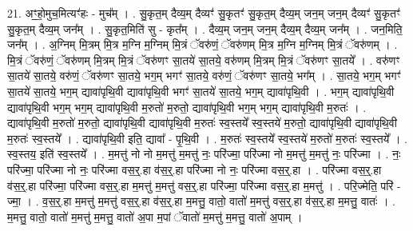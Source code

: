 \documentclass[17pt]{extarticle}
\begin{document}
21. अꣳ॒॒हो॒मुच॒मित्यꣳ॑हः - मुच᳚म् । . सु॒कृत॒म् दैव्य॒म् दैव्यꣳ॑ सु॒कृतꣳ॑ सु॒कृत॒म् दैव्य॒म् जन॒म् जन॒म् दैव्यꣳ॑ सु॒कृतꣳ॑ सु॒कृत॒म् दैव्य॒म् जन᳚म् । . सु॒कृत॒मिति॑ सु - कृत᳚म् । . दैव्य॒म् जन॒म् जन॒म् दैव्य॒म् दैव्य॒म् जन᳚म् । . जन॒मिति॒ जन᳚म् । . अ॒ग्निम् मि॒त्रम् मि॒त्र म॒ग्नि म॒ग्निम् मि॒त्रं ॅवरु॑णं॒ ॅवरु॑णम् मि॒त्र म॒ग्नि म॒ग्निम् मि॒त्रं ॅवरु॑णम् । . मि॒त्रं ॅवरु॑णं॒ ॅवरु॑णम् मि॒त्रम् मि॒त्रं ॅवरु॑णꣳ सा॒तये॑ सा॒तये॒ वरु॑णम् मि॒त्रम् मि॒त्रं ॅवरु॑णꣳ सा॒तये᳚ । . वरु॑णꣳ सा॒तये॑ सा॒तये॒ वरु॑णं॒ ॅवरु॑णꣳ सा॒तये॒ भग॒म् भगꣳ॑ सा॒तये॒ वरु॑णं॒ ॅवरु॑णꣳ सा॒तये॒ भग᳚म् । . सा॒तये॒ भग॒म् भगꣳ॑ सा॒तये॑ सा॒तये॒ भग॒म् द्यावा॑पृथि॒वी द्यावा॑पृथि॒वी भगꣳ॑ सा॒तये॑ सा॒तये॒ भग॒म् द्यावा॑पृथि॒वी । . भग॒म् द्यावा॑पृथि॒वी द्यावा॑पृथि॒वी भग॒म् भग॒म् द्यावा॑पृथि॒वी म॒रुतो॑ म॒रुतो॒ द्यावा॑पृथि॒वी भग॒म् भग॒म् द्यावा॑पृथि॒वी म॒रुतः॑ । . द्यावा॑पृथि॒वी म॒रुतो॑ म॒रुतो॒ द्यावा॑पृथि॒वी द्यावा॑पृथि॒वी म॒रुतः॑ स्व॒स्तये᳚ स्व॒स्तये॑ म॒रुतो॒ द्यावा॑पृथि॒वी द्यावा॑पृथि॒वी म॒रुतः॑ स्व॒स्तये᳚ । . द्यावा॑पृथि॒वी इति॒ द्यावा᳚ - पृ॒थि॒वी । . म॒रुतः॑ स्व॒स्तये᳚ स्व॒स्तये॑ म॒रुतो॑ म॒रुतः॑ स्व॒स्तये᳚ । . स्व॒स्तय॒ इति॑ स्व॒स्तये᳚ । . म॒मत्तु॑ नो नो म॒मत्तु॑ म॒मत्तु॑ नः॒ परि॑ज्मा॒ परि॑ज्मा नो म॒मत्तु॑ म॒मत्तु॑ नः॒ परि॑ज्मा । . नः॒ परि॑ज्मा॒ परि॑ज्मा नो नः॒ परि॑ज्मा वस॒र्॒.हा व॑स॒र्॒.हा परि॑ज्मा नो नः॒ परि॑ज्मा वस॒र्॒.हा । . परि॑ज्मा वस॒र्॒.हा व॑स॒र्॒.हा परि॑ज्मा॒ परि॑ज्मा वस॒र्॒.हा म॒मत्तु॑ म॒मत्तु॑ वस॒र्॒.हा परि॑ज्मा॒ परि॑ज्मा वस॒र्॒.हा म॒मत्तु॑ । . परि॒ज्मेति॒ परि॑ - ज्मा॒ । . व॒स॒र्॒.हा म॒मत्तु॑ म॒मत्तु॑ वस॒र्॒.हा व॑स॒र्॒.हा म॒मत्तु॒ वातो॒ वातो॑ म॒मत्तु॑ वस॒र्॒.हा व॑स॒र्॒.हा म॒मत्तु॒ वातः॑ । . म॒मत्तु॒ वातो॒ वातो॑ म॒मत्तु॑ म॒मत्तु॒ वातो॑ अ॒पा म॒पां ॅवातो॑ म॒मत्तु॑ म॒मत्तु॒ वातो॑ अ॒पाम् । \newline
\end{document}
